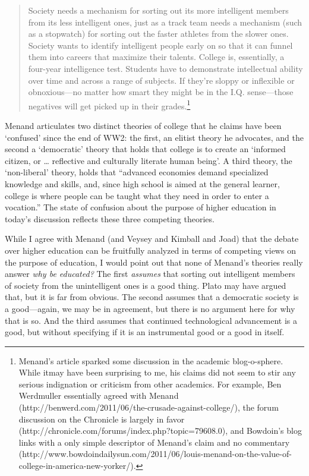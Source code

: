 \begin{quote}

Society needs a mechanism for sorting out its more intelligent members from its less intelligent ones, just as a track team needs a mechanism (such as a stopwatch) for sorting out the faster athletes from the slower ones. Society wants to identify intelligent people early on so that it can funnel them into careers that maximize their talents.
College is, essentially, a four-year intelligence test. Students have to demonstrate intellectual ability over time and across a range of subjects. If they're sloppy or inflexible or obnoxious---no matter how smart they might be in the I.Q. sense---those negatives will get picked up in their grades.\footnote{Menand's article sparked some discussion in the academic blog-o-sphere. While itmay have been surprising to me, his claims did not seem to stir any serious indignation or criticism from other academics. For example, Ben Werdmuller essentially agreed with Menand (http:\slash \slash benwerd.com\slash 2011\slash 06\slash the-crusade-against-college\slash ), the forum discussion on the Chronicle is largely in favor (http:\slash \slash chronicle.com\slash forums\slash index.php?topic=79608.0), and Bowdoin's blog links with a only simple descriptor of Menand's claim and no commentary (http:\slash \slash www.bowdoindailysun.com\slash 2011\slash 06\slash louis-menand-on-the-value-of-college-in-america-new-yorker\slash ).} ~\citep{Menand:2011wg}
\end{quote}

Menand articulates two distinct theories of college that he claims have been `confused' since the end of WW2: the first, an elitist theory he advocates, and the second a `democratic' theory that holds that college is to create an `informed citizen, or {\ldots} reflective and culturally literate human being'. A third theory, the `non-liberal' theory, holds that ``advanced economies demand specialized knowledge and skills, and, since high school is aimed at the general learner, college is where people can be taught what they need in order to enter a vocation.'' The state of confusion about the purpose of higher education in today's discussion reflects these three competing theories.

While I agree with Menand (and Veysey and Kimball and Joad) that the debate over higher education can be fruitfully analyzed in terms of competing views on the purpose of education, I would point out that none of Menand's theories really answer \emph{why be educated?} The first \emph{assumes} that sorting out intelligent members of society from the unintelligent ones is a good thing. Plato may have argued that, but it is far from obvious. The second assumes that a democratic society is a good---again, we may be in agreement, but there is no argument here for why that is so. And the third assumes that continued technological advancement is a good, but without specifying if it is an instrumental good or a good in itself. 

